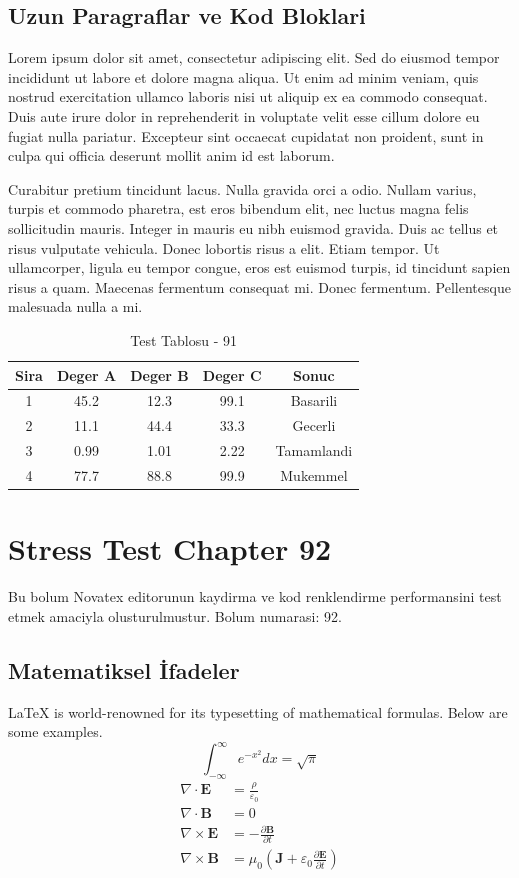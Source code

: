 \documentclass[12pt,a4paper]{article}
\begin{document}
\subsection{Uzun Paragraflar ve Kod Bloklari}
Lorem ipsum dolor sit amet, consectetur adipiscing elit. Sed do eiusmod tempor incididunt ut labore et dolore magna aliqua. Ut enim ad minim veniam, quis nostrud exercitation ullamco laboris nisi ut aliquip ex ea commodo consequat. Duis aute irure dolor in reprehenderit in voluptate velit esse cillum dolore eu fugiat nulla pariatur. Excepteur sint occaecat cupidatat non proident, sunt in culpa qui officia deserunt mollit anim id est laborum.

Curabitur pretium tincidunt lacus. Nulla gravida orci a odio. Nullam varius, turpis et commodo pharetra, est eros bibendum elit, nec luctus magna felis sollicitudin mauris. Integer in mauris eu nibh euismod gravida. Duis ac tellus et risus vulputate vehicula. Donec lobortis risus a elit. Etiam tempor. Ut ullamcorper, ligula eu tempor congue, eros est euismod turpis, id tincidunt sapien risus a quam. Maecenas fermentum consequat mi. Donec fermentum. Pellentesque malesuada nulla a mi.

\begin{table}[h!]
\centering
\begin{tabular}{|c|c|c|c|c|}
\hline
\textbf{Sira} & \textbf{Deger A} & \textbf{Deger B} & \textbf{Deger C} & \textbf{Sonuc} \\
\hline
1 & 45.2 & 12.3 & 99.1 & Basarili \\
2 & 11.1 & 44.4 & 33.3 & Gecerli \\
3 & 0.99 & 1.01 & 2.22 & Tamamlandi \\
4 & 77.7 & 88.8 & 99.9 & Mukemmel \\
\hline
\end{tabular}
\caption{Test Tablosu - 91}
\end{table}

\newpage
\section{Stress Test Chapter 92}
Bu bolum Novatex editorunun kaydirma ve kod renklendirme performansini test etmek amaciyla olusturulmustur. Bolum numarasi: 92.

\subsection{Matematiksel İfadeler}
\LaTeX{} is world-renowned for its typesetting of mathematical formulas. Below are some examples.
\begin{equation}
\int_{-\infty}^{\infty} e^{-x^2} dx = \sqrt{\pi}
\end{equation}
\begin{align}
\nabla \cdot \mathbf{E} &= \frac{\rho}{\varepsilon_0} \\
\nabla \cdot \mathbf{B} &= 0 \\
\nabla \times \mathbf{E} &= -\frac{\partial \mathbf{B}}{\partial t} \\
\nabla \times \mathbf{B} &= \mu_0\left(\mathbf{J} + \varepsilon_0 \frac{\partial \mathbf{E}}{\partial t}\right)
\end{align}
\end{document}
